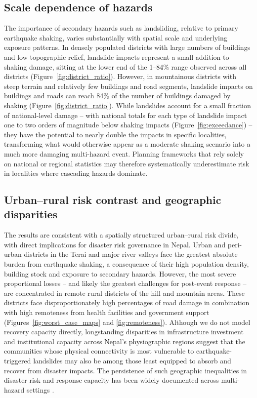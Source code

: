 \documentclass[preprint,12pt,authoryear]{elsarticle}
\begin{document}
\subsection{Scale dependence of hazards}

The importance of secondary hazards such as landsliding, relative to primary earthquake shaking, varies substantially with spatial scale and underlying exposure patterns. In densely populated districts with large numbers of buildings and low topographic relief, landslide impacts represent a small addition to shaking damage, sitting at the lower end of the 1--84\% range observed across all districts (Figure~\ref{fig:district_ratio}). However, in mountainous districts with steep terrain and relatively few buildings and road segments, landslide impacts on buildings and roads can reach 84\% of the number of buildings damaged by shaking (Figure~\ref{fig:district_ratio}). While landslides account for a small fraction of national-level damage -- with national totals for each type of landslide impact one to two orders of magnitude below shaking impacts (Figure~\ref{fig:exceedance}) -- they have the potential to nearly double the impacts in specific localities, transforming what would otherwise appear as a moderate shaking scenario into a much more damaging multi-hazard event. Planning frameworks that rely solely on national or regional statistics may therefore systematically underestimate risk in localities where cascading hazards dominate.

\subsection{Urban--rural risk contrast and geographic disparities}

The results are consistent with a spatially structured urban--rural risk divide, with direct implications for disaster risk governance in Nepal. Urban and peri-urban districts in the Terai and major river valleys face the greatest absolute burden from earthquake shaking, a consequence of their high population density, building stock and exposure to secondary hazards. However, the most severe proportional losses -- and likely the greatest challenges for post-event response -- are concentrated in remote rural districts of the hill and mountain areas. These districts face disproportionately high percentages of road damage in combination with high remoteness from health facilities and government support (Figures~\ref{fig:worst_case_maps} and \ref{fig:remoteness}). Although we do not model recovery capacity directly, longstanding disparities in infrastructure investment and institutional capacity across Nepal's physiographic regions \citep{NationalPlanningCommission2014} suggest that the communities whose physical connectivity is most vulnerable to earthquake-triggered landslides may also be among those least equipped to absorb and recover from disaster impacts. The persistence of such geographic inequalities in disaster risk and response capacity has been widely documented across multi-hazard settings \citep{Wisner2004}.
\end{document}
